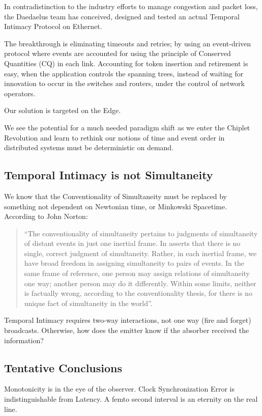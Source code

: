 In contradistinction to the industry efforts to manage congestion and packet loss, the Daedaelus team has conceived, designed and tested an actual Temporal Intimacy Protocol on Ethernet.

The breakthrough is eliminating timeouts and retries; by using an event-driven protocol where events are accounted for using the principle of Conserved Quantities (CQ) in each link. Accounting for token insertion and retirement is easy, when the application controls the spanning trees, instead of waiting for innovation to occur in the switches and routers, under the control of network operators.

Our solution is targeted on the Edge.

We see the potential for a much needed paradigm shift as we enter the Chiplet Revolution and learn to rethink our notions of time and event order in distributed systems must be deterministic on demand.

\subsection{Temporal Intimacy is not Simultaneity}
We know that the Conventionality of Simultaneity must be replaced by something not dependent on Newtonian time, or Minkowski Spacetime. According to John Norton:
\begin{quote}
“The conventionality of simultaneity pertains to judgments of simultaneity of distant events in just one inertial frame. In asserts that there is no single, correct judgment of simultaneity. Rather, in each inertial frame, we have broad freedom in assigning simultaneity to pairs of events. In the same frame of reference, one person may assign relations of simultaneity one way; another person may do it differently. Within some limits, neither is factually wrong, according to the conventionality thesis, for there is no unique fact of simultaneity in the world”.
\end{quote}

Temporal Intimacy requires two-way interactions, not one way (fire and forget) broadcasts. Otherwise, how does the emitter know if the absorber received the information?

\subsection{Tentative Conclusions}
Monotonicity is in the eye of the observer.
Clock Synchronization Error is indistinguishable from Latency.
A femto second interval is an eternity on the real line.

